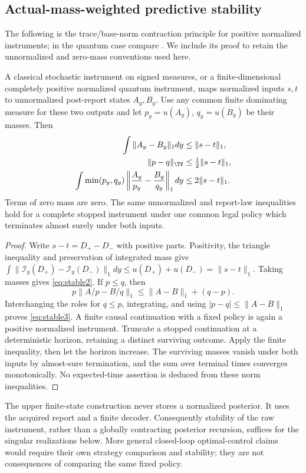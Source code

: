 \subsection*{Actual-mass-weighted predictive stability}
The following is the trace/base-norm contraction principle for positive normalized instruments; in the quantum case compare \cite[Corollary 3.40]{Watrous18}. We include its proof to retain the unnormalized and zero-mass conventions used here.
\begin{proposition}\label{prop:continuity}
A classical stochastic instrument on signed measures, or a finite-dimensional completely positive normalized quantum instrument, maps normalized inputs $s,t$ to unnormalized post-report states $A_y,B_y$. Use any common finite dominating measure for these two outputs and let $p_y=u(A_y)$, $q_y=u(B_y)$ be their masses. Then
\begin{align}
 \int\|A_y-B_y\|_1dy&\le\|s-t\|_1,\label{eq:stable1}\\
 \|p-q\|_{\TV}&\le\tfrac12\|s-t\|_1,\label{eq:stable2}\\
 \int\min(p_y,q_y)\left\|\frac{A_y}{p_y}-\frac{B_y}{q_y}\right\|_1dy
 &\le2\|s-t\|_1.\label{eq:stable3}
\end{align}
Terms of zero mass are zero. The same unnormalized and report-law inequalities hold for a complete stopped instrument under one common legal policy which terminates almost surely under both inputs.
\end{proposition}
\begin{proof}
Write $s-t=D_+-D_-$ with positive parts. Positivity, the triangle inequality and preservation of integrated mass give
$\int\|\mathcal I_y(D_+)-\mathcal I_y(D_-)\|_1dy\le u(D_+)+u(D_-)=\|s-t\|_1$.
Taking masses gives \eqref{eq:stable2}. If $p\le q$, then
\[
 p\|A/p-B/q\|_1\le\|A-B\|_1+(q-p).
\]
Interchanging the roles for $q\le p$, integrating, and using $|p-q|\le\|A-B\|_1$ proves \eqref{eq:stable3}. A finite causal continuation with a fixed policy is again a positive normalized instrument. Truncate a stopped continuation at a deterministic horizon, retaining a distinct surviving outcome. Apply the finite inequality, then let the horizon increase. The surviving masses vanish under both inputs by almost-sure termination, and the sum over terminal times converges monotonically. No expected-time assertion is deduced from these norm inequalities.
\end{proof}

The upper finite-state construction never stores a normalized posterior. It uses the acquired report and a finite decoder. Consequently stability of the raw instrument, rather than a globally contracting posterior recursion, suffices for the singular realizations below. More general closed-loop optimal-control claims would require their own strategy comparison and stability; they are not consequences of comparing the same fixed policy.
